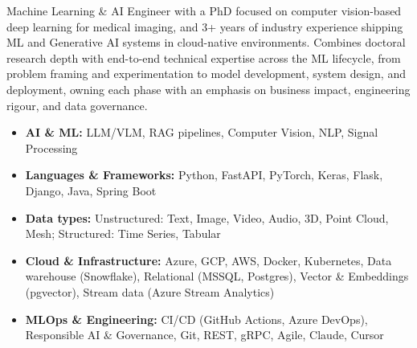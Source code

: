 \documentclass[12pt,a4paper,withhyper]{altacv}
\begin{document}


\makecvheader{}

\medskip


Machine Learning \& AI Engineer with a PhD focused on computer vision-based deep learning for medical imaging, and 3+ years of industry experience shipping ML and Generative AI systems in cloud-native environments. Combines doctoral research depth with end-to-end technical expertise across the ML lifecycle, from problem framing and experimentation to model development, system design, and deployment, owning each phase with an emphasis on business impact, engineering rigour, and data governance.

\begin{itemize}
    \item \textbf{AI \& ML:} LLM/VLM, RAG pipelines, Computer Vision, NLP, Signal Processing
    \item \textbf{Languages \& Frameworks:} Python, FastAPI, PyTorch, Keras, Flask, Django, Java, Spring Boot
    \item \textbf{Data types:} Unstructured: Text, Image, Video, Audio, 3D, Point Cloud, Mesh; Structured: Time Series, Tabular
    \item \textbf{Cloud \& Infrastructure:} Azure, GCP, AWS, Docker, Kubernetes, Data warehouse (Snowflake), Relational (MSSQL, Postgres), Vector \& Embeddings (pgvector), Stream data (Azure Stream Analytics)
    \item \textbf{MLOps \& Engineering:} CI/CD (GitHub Actions, Azure DevOps), Responsible AI \& Governance, Git, REST, gRPC, Agile, Claude, Cursor
\end{itemize}

\medskip

\end{document}
